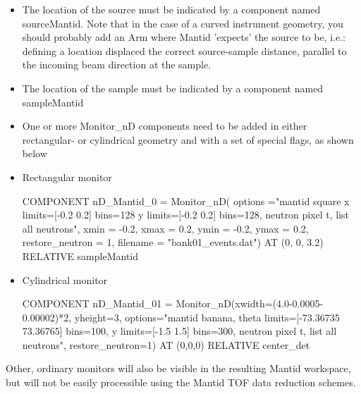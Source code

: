 \begin{itemize}
\item The location of the source must be indicated by a component
  named sourceMantid. Note that in the case of a curved instrument
  geometry, you should probably add an Arm where Mantid 'expects' the
  source to be, i.e.: defining a location displaced the correct
  source-sample distance, parallel to the incoming beam direction at
  the sample.
\item The location of the sample must be indicated by a component
  named sampleMantid
\item One or more Monitor\_nD components need to be added in either
  rectangular- or cylindrical geometry and with a set of special
  flags, as shown below
\item Rectangular monitor
  \begin{mcstas}
    COMPONENT nD_Mantid_0 = Monitor_nD(
    options ="mantid square x limits=[-0.2 0.2] bins=128 y limits=[-0.2 0.2] bins=128, neutron pixel t, list all neutrons",
    xmin = -0.2,
    xmax = 0.2,
    ymin = -0.2,
    ymax = 0.2,
    restore_neutron = 1,
    filename = "bank01_events.dat")
  AT (0, 0, 3.2) RELATIVE sampleMantid 
\end{mcstas}
\item Cylindrical monitor
  \begin{mcstas}
    COMPONENT nD_Mantid_01 = Monitor_nD(xwidth=(4.0-0.0005-0.00002)*2, yheight=3,
    options="mantid banana, theta limits=[-73.36735 73.36765] bins=100, y limits=[-1.5 1.5] bins=300, neutron pixel t, list all neutrons", restore_neutron=1)
    AT (0,0,0) RELATIVE center_det
\end{mcstas}
\end{itemize}

Other, ordinary \MCS monitors will also be visible in the resulting
Mantid workspace, but will not be easily processible using the Mantid
TOF data reduction schemes.


